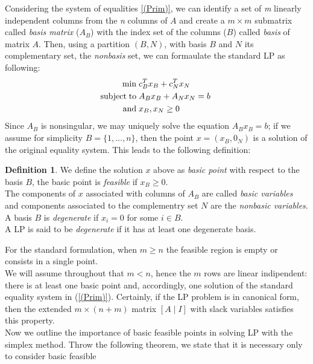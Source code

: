 \documentclass[a4paper,10 pt,titlepage,twoside]{book}
\theoremstyle{plain}
\theoremstyle{definition}
\newtheorem{defn}[thm]{Definition}
\theoremstyle{remark}
\begin{document}
Considering the system of equalities \ref{(Prim)}, we can identify a set of \textit{m} linearly independent columns from the \textit{n} columns of  $A$ and create a $m \times m$ submatrix called \textit{basis matrix} ($A_{B}$) with the index set of the columns ($B$) called \textit{basis} of matrix $A$. Then, using a partition $(B, N)$, with basis $B$ and $N$ its complementary set, the \textit{nonbasis} set, we can formaulate the standard LP as following:
\begin{equation}\label{(Prim1)}
\begin{split}
\min\;&c_{B}^{T}x_{B}+c_{N}^{T}x_{N}\\
\text{subject\;to\;}&A_{B}x_{B}+A_{N}x_{N}= b\;\\\text{and\;}&x_{B},x_{N}\geq0
\end{split}
\end{equation}
Since $A_{B}$ is nonsingular, we may uniquely solve the equation $A_{B}x_{B} = b$; if we assume for simplicity $B = \{1, \dots, n\}$, then the point $x =\left(x_{B},0_{N}\right)$ is a solution of the original equality system. This leads to the following definition:
\begin{defn}

	We define the solution $x$ above as \textit{basic point} with respect to the basis $B$, the basic point is \textit{feasible} if $x_{B}\geq 0$. \\The components of $x$ associated with columns of $A_{B}$ are called \textit{basic variables} and components associated to the complementry set $N$ are the \textit{nonbasic variables}.\\
	A basis $B$ is \textit{degenerate} if $x_{i}= 0$ for some $i\in B$.\\
	A LP is said to be \textit{degenerate} if it has at least one degenerate basis.
\end{defn}
For the standard formulation, when $m \geq n$ the feasible region is empty or consists in a single point.\\
 We will assume throughout that $m < n$, hence the $m$ rows are linear indipendent: there is at least one basic point and, accordingly, one solution of the standard equality system in (\ref{(Prim)}). Certainly, if the LP problem is in canonical form, then the extended $m \times (n+m)$ matrix $[A\;|\;I]$ with slack variables satisfies this property. \\
Now we outline the importance of basic feasible points in solving LP with the simplex method.
Throw the following theorem, we state that it is necessary only to consider basic feasible
\end{document}
